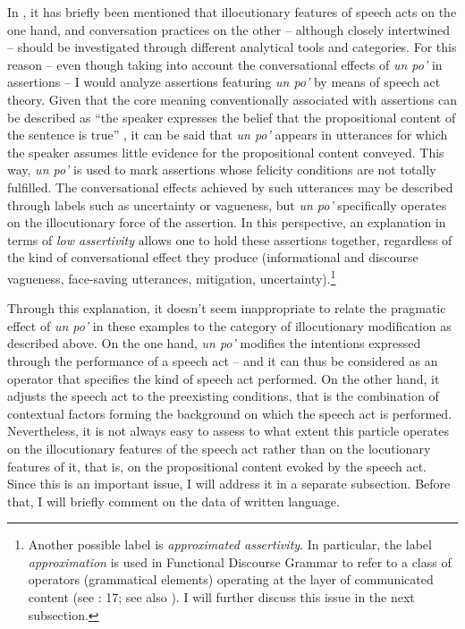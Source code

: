 \hspace*{-.2pt}In , it has briefly been mentioned that illocutionary features of speech acts on the one hand, and conversation practices on the other – although closely intertwined – should be investigated through different analytical tools and categories. For this reason – even though taking into account the conversational effects of \textit{un po’} in assertions – I would analyze assertions featuring \textit{un po’} by means of speech act theory. Given that the core meaning conventionally associated with assertions can be described as “the speaker expresses the belief that the propositional content of the sentence is true” \citep{Searle1969}, it can be said that \textit{un po’} appears in utterances for which the speaker assumes little evidence for the propositional content conveyed.\textsuperscript{} This way, \textit{un po’} is used to mark assertions whose felicity conditions are not totally fulfilled. The conversational effects achieved by such utterances may be described through labels such as uncertainty or vagueness, but \textit{un po’} specifically operates on the illocutionary force of the assertion. In this perspective, an explanation in terms of \textit{low assertivity} allows one to hold these assertions together, regardless of the kind of conversational effect they produce (informational and discourse vagueness, face-saving utterances, mitigation, uncertainty).\footnote{Another possible label is \textit{approximated assertivity}. In particular, the label \textit{approximation} is used in Functional Discourse Grammar to refer to a class of operators (grammatical elements) operating at the layer of communicated content (see \citealt{Hengeveld2017}: 17; see also \citealt{HengeveldKeizer2011}). I will further discuss this issue in the next subsection.}

Through this explanation, it doesn’t seem inappropriate to relate the pragmatic effect of \textit{un po’} in these examples to the category of illocutionary modification as described above. On the one hand, \textit{un po’} modifies the intentions expressed through the performance of a speech act – and it can thus be considered as an operator that specifies the kind of speech act performed. On the other hand, it adjusts the speech act to the preexisting conditions, that is the combination of contextual factors forming the background on which the speech act is performed. Nevertheless, it is not always easy to assess to what extent this particle operates on the illocutionary features of the speech act rather than on the locutionary features of it, that is, on the propositional content evoked by the speech act. Since this is an important issue, I will address it in a separate subsection. Before that, I will briefly comment on the data of written language.

